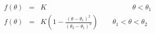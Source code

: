 \documentclass[12pt]{article}
\begin{document}
\begin{eqnarray*}
        f(\theta) & = & K \qquad\qquad\qquad\qquad\qquad\qquad \theta < \theta_1 \\
        f(\theta) & = & K \left(1-\frac{(\theta - \theta_1)^2}{(\theta_2 - \theta_1)^2}\right) \qquad \theta_1 < \theta < \theta_2
\end{eqnarray*}
\end{document}
